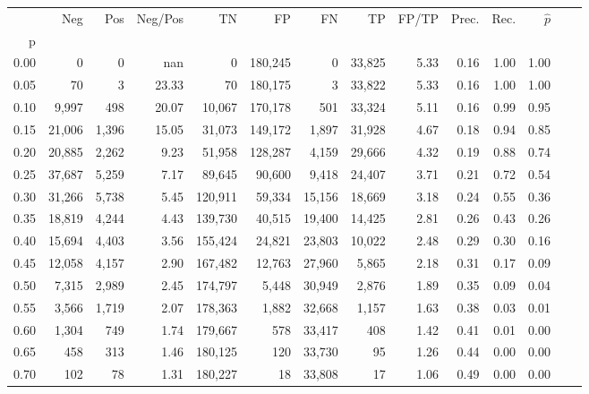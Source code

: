 \begin{tabular}{rrrrrrrrrrrrrr}
\toprule
{} &     Neg &    Pos & Neg/Pos &       TN &       FP &      FN &      TP & FP/TP & Prec. &  Rec. & $\hat{p}$ \\
p    &         &        &         &          &          &         &         &       &       &       &           \\
\midrule
0.00 &       0 &      0 &     nan &        0 &  180,245 &       0 &  33,825 &  5.33 &  0.16 &  1.00 &      1.00 \\
0.05 &      70 &      3 &   23.33 &       70 &  180,175 &       3 &  33,822 &  5.33 &  0.16 &  1.00 &      1.00 \\
0.10 &   9,997 &    498 &   20.07 &   10,067 &  170,178 &     501 &  33,324 &  5.11 &  0.16 &  0.99 &      0.95 \\
0.15 &  21,006 &  1,396 &   15.05 &   31,073 &  149,172 &   1,897 &  31,928 &  4.67 &  0.18 &  0.94 &      0.85 \\
0.20 &  20,885 &  2,262 &    9.23 &   51,958 &  128,287 &   4,159 &  29,666 &  4.32 &  0.19 &  0.88 &      0.74 \\
0.25 &  37,687 &  5,259 &    7.17 &   89,645 &   90,600 &   9,418 &  24,407 &  3.71 &  0.21 &  0.72 &      0.54 \\
0.30 &  31,266 &  5,738 &    5.45 &  120,911 &   59,334 &  15,156 &  18,669 &  3.18 &  0.24 &  0.55 &      0.36 \\
0.35 &  18,819 &  4,244 &    4.43 &  139,730 &   40,515 &  19,400 &  14,425 &  2.81 &  0.26 &  0.43 &      0.26 \\
0.40 &  15,694 &  4,403 &    3.56 &  155,424 &   24,821 &  23,803 &  10,022 &  2.48 &  0.29 &  0.30 &      0.16 \\
0.45 &  12,058 &  4,157 &    2.90 &  167,482 &   12,763 &  27,960 &   5,865 &  2.18 &  0.31 &  0.17 &      0.09 \\
0.50 &   7,315 &  2,989 &    2.45 &  174,797 &    5,448 &  30,949 &   2,876 &  1.89 &  0.35 &  0.09 &      0.04 \\
0.55 &   3,566 &  1,719 &    2.07 &  178,363 &    1,882 &  32,668 &   1,157 &  1.63 &  0.38 &  0.03 &      0.01 \\
0.60 &   1,304 &    749 &    1.74 &  179,667 &      578 &  33,417 &     408 &  1.42 &  0.41 &  0.01 &      0.00 \\
0.65 &     458 &    313 &    1.46 &  180,125 &      120 &  33,730 &      95 &  1.26 &  0.44 &  0.00 &      0.00 \\
0.70 &     102 &     78 &    1.31 &  180,227 &       18 &  33,808 &      17 &  1.06 &  0.49 &  0.00 &      0.00 \\

\end{tabular}
